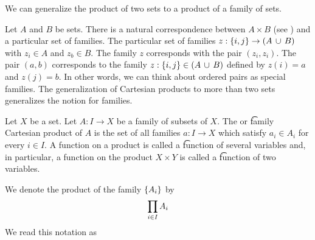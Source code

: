 

We can generalize the product of two sets to a product of a family of sets.


Let $A$ and $B$ be sets.
There is a natural correspondence between $A \times B$ (see ) and a particular set of families.
The particular set of families $z: \{i, j\} \to (A \,\cup\, B)$ with $z_i \in A$ and $z_b \in B$.
The family $z$ corresponds with the pair $(z_i, z_i)$.
The pair $(a, b)$ corresponds to the family $z: \{i, j\} \in (A \,\cup\, B)$ defined by $z(i) = a$ and $z(j) = b$.
In other words, we can think about ordered pairs as special families.
The generalization of Cartesian products to more than two sets generalizes the notion for families.


Let $X$ be a set.
Let $A: I \to X$ be a family of subsets of $X$.
The  or \t{family Cartesian product} of $A$ is the set of all families $a: I \to X$ which satisfy $a_i \in A_i$ for every $i \in I$.
A function on a product is called a \t{function of several variables} and, in particular, a function on the product $X \times Y$ is called a \t{function of two variables.}


We denote the product of the family $\{A_i\}$ by
\[
  \prod_{i \in I} A_i
\]
We read this notation as 
%

